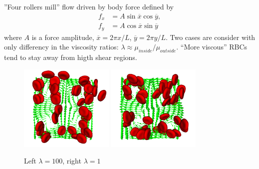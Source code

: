 ''Four rollers mill'' flow driven by body force defined by
\begin{align*}
  f_x &= A \sin \overline{x} \cos \overline{y}, \\
  f_y &= A \cos \overline{x} \sin \overline{y}
\end{align*}
where $A$ is a force amplitude, $\overline{x} = 2 \pi x / L$,
$\overline{y} = 2 \pi y / L$. Two cases are consider with only
differency in the viscosity ratios: $\lambda \approx \mu_{inside} /
\mu_{outside}$. ``More viscous'' RBCs tend to stay away from higth
shear regions.

\begin{figure}
\begin{center}
  \includegraphics[width=0.4\textwidth]{i/rbc/a/visit.png}
  \includegraphics[width=0.4\textwidth]{i/rbc/b/visit.png}
  \caption{Left $\lambda = 100$, right $\lambda = 1$}
\end{center}
\end{figure}


